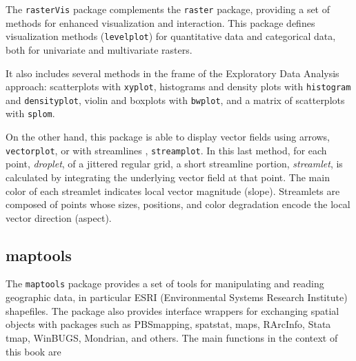 \documentclass[smallroyalvopaper]{memoir}
\begin{document}
The \texttt{rasterVis} package \cite{Perpinan.Hijmans2013} complements the \texttt{raster} package, providing a set of methods for enhanced visualization and interaction. This package defines visualization methods (\texttt{levelplot}) for quantitative data and categorical data, both for univariate and multivariate rasters.

It also includes several methods in the frame of the Exploratory Data Analysis approach: scatterplots with \texttt{xyplot}, histograms and density plots with \texttt{histogram} and \texttt{densityplot}, violin and boxplots with \texttt{bwplot}, and a matrix of scatterplots with \texttt{splom}.

On the other hand, this package is able to display vector fields using arrows, \texttt{vectorplot}, or with streamlines \cite{Wegenkittl.Groeller1997}, \texttt{streamplot}. In this last method, for each point, \emph{droplet}, of a jittered regular grid, a short streamline portion, \emph{streamlet}, is calculated by integrating the underlying vector field at that point. The main color of each streamlet indicates local vector magnitude (slope). Streamlets are composed of points whose sizes, positions, and color degradation encode the local vector direction (aspect).

\subsection{maptools}
\label{sec:orgheadline27}
\label{sec:maptools}

The \texttt{maptools} package \cite{Bivand.Lewin-Koh2013} provides a set of tools for manipulating and reading geographic data, in particular ESRI (Environmental Systems Research Institute) shapefiles. The package also provides interface wrappers for exchanging spatial objects with packages such as PBSmapping, spatstat, maps, RArcInfo, Stata tmap, WinBUGS, Mondrian, and others. The main functions in the context of this book are
\end{document}
